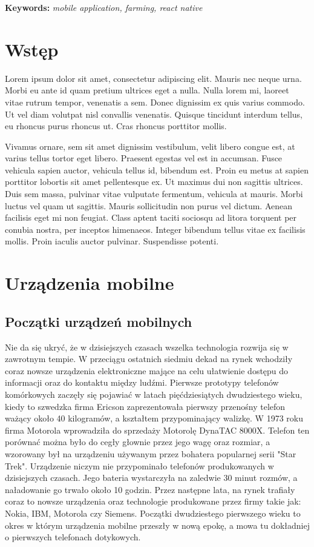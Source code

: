 \documentclass[a4paper,12pt,oneside]{book}
\begin{document}
		\textbf{Keywords:} \textit{mobile application, farming, react native}
	
	\newpage
	\thispagestyle{empty} %
	\tableofcontents %
	
	\newpage
	\thispagestyle{empty}
	\chapter*{Wstęp} %
	Lorem ipsum dolor sit amet, consectetur adipiscing elit. Mauris nec neque urna. Morbi eu ante id quam pretium ultrices eget a nulla. Nulla lorem mi, laoreet vitae rutrum tempor, venenatis a sem. Donec dignissim ex quis varius commodo. Ut vel diam volutpat nisl convallis venenatis. Quisque tincidunt interdum tellus, eu rhoncus purus rhoncus ut. Cras rhoncus porttitor mollis.
	
	Vivamus ornare, sem sit amet dignissim vestibulum, velit libero congue est, at varius tellus tortor eget libero. Praesent egestas vel est in accumsan. Fusce vehicula sapien auctor, vehicula tellus id, bibendum est. Proin eu metus at sapien porttitor lobortis sit amet pellentesque ex. Ut maximus dui non sagittis ultrices. Duis sem massa, pulvinar vitae vulputate fermentum, vehicula at mauris. Morbi luctus vel quam ut sagittis. Mauris sollicitudin non purus vel dictum. Aenean facilisis eget mi non feugiat. Class aptent taciti sociosqu ad litora torquent per conubia nostra, per inceptos himenaeos. Integer bibendum tellus vitae ex facilisis mollis. Proin iaculis auctor pulvinar. Suspendisse potenti.
	
	\newpage
	\thispagestyle{empty}
	\chapter{Urządzenia mobilne}
	\section{Początki urządzeń mobilnych}
	Nie da się ukryć, że w dzisiejszych czasach wszelka technologia rozwija się w zawrotnym tempie. W przeciągu ostatnich siedmiu dekad na rynek wchodziły coraz nowsze urządzenia elektroniczne mające na celu ułatwienie dostępu do informacji oraz do kontaktu między ludźmi. Pierwsze prototypy telefonów komórkowych zaczęły się pojawiać w latach pięćdziesiątych dwudziestego wieku, kiedy to szwedzka firma Ericson zaprezentowała pierwszy przenośny telefon ważący około 40 kilogramów, a kształtem przypominający walizkę. W 1973 roku firma Motorola wprowadziła do sprzedaży Motorolę DynaTAC 8000X. Telefon ten porównać można było do cegły głownie przez jego wagę oraz rozmiar, a wzorowany był na urządzeniu używanym przez bohatera popularnej serii "Star Trek". Urządzenie niczym nie przypominało telefonów produkowanych w dzisiejszych czasach. Jego bateria wystarczyła na zaledwie 30 minut rozmów, a naładowanie go trwało około 10 godzin. Przez następne lata, na rynek trafiały coraz to nowsze urządzenia oraz technologie produkowane przez firmy takie jak: Nokia, IBM, Motorola czy Siemens. Początki dwudziestego pierwszego wieku to okres w którym urządzenia mobilne przeszły w nową epokę, a mowa tu dokładniej o pierwszych telefonach dotykowych.
	
\end{document}

